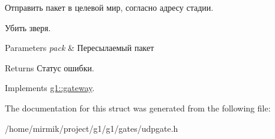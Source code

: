 Отправить пакет в целевой мир, согласно адресу стадии. 

Убить зверя. 
\begin{DoxyParams}{Parameters}
{\em pack} & Пересылаемый пакет \\
\hline
\end{DoxyParams}
\begin{DoxyReturn}{Returns}
Статус ошибки. 
\end{DoxyReturn}


Implements \hyperlink{structg1_1_1gateway_a5748219660a573356ab0e52f715eebbf}{g1\+::gateway}.



The documentation for this struct was generated from the following file\+:\begin{DoxyCompactItemize}
\item 
/home/mirmik/project/g1/g1/gates/udpgate.\+h\end{DoxyCompactItemize}
